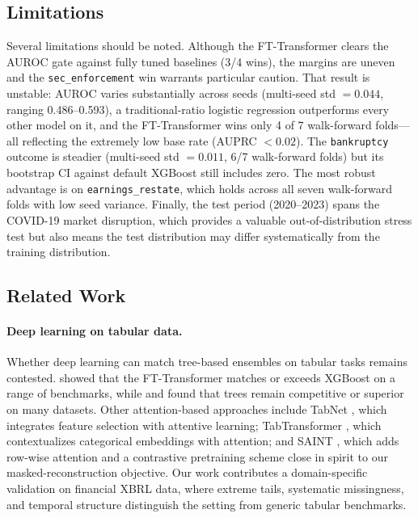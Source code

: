 \subsection{Limitations}
\label{sec:limitations}

Several limitations should be noted. Although the FT-Transformer clears the AUROC gate against fully tuned baselines (3/4 wins), the margins are uneven and the \texttt{sec\_enforcement} win warrants particular caution. That result is unstable: AUROC varies substantially across seeds (multi-seed std $= 0.044$, ranging 0.486--0.593), a traditional-ratio logistic regression outperforms every other model on it, and the FT-Transformer wins only 4 of 7 walk-forward folds---all reflecting the extremely low base rate (AUPRC $< 0.02$). The \texttt{bankruptcy} outcome is steadier (multi-seed std $= 0.011$, 6/7 walk-forward folds) but its bootstrap CI against default XGBoost still includes zero. The most robust advantage is on \texttt{earnings\_restate}, which holds across all seven walk-forward folds with low seed variance. Finally, the test period (2020--2023) spans the COVID-19 market disruption, which provides a valuable out-of-distribution stress test but also means the test distribution may differ systematically from the training distribution.

\subsection{Related Work}
\label{sec:related}

\paragraph{Deep learning on tabular data.} Whether deep learning can match tree-based ensembles on tabular tasks remains contested. \citet{gorishniy2021revisiting} showed that the FT-Transformer matches or exceeds XGBoost on a range of benchmarks, while \citet{grinsztajn2022tree} and \citet{shwartzziv2022tabular} found that trees remain competitive or superior on many datasets. Other attention-based approaches include TabNet \citep{arik2021tabnet}, which integrates feature selection with attentive learning; TabTransformer \citep{huang2020tabtransformer}, which contextualizes categorical embeddings with attention; and SAINT \citep{somepalli2021saint}, which adds row-wise attention and a contrastive pretraining scheme close in spirit to our masked-reconstruction objective. Our work contributes a domain-specific validation on financial XBRL data, where extreme tails, systematic missingness, and temporal structure distinguish the setting from generic tabular benchmarks.

